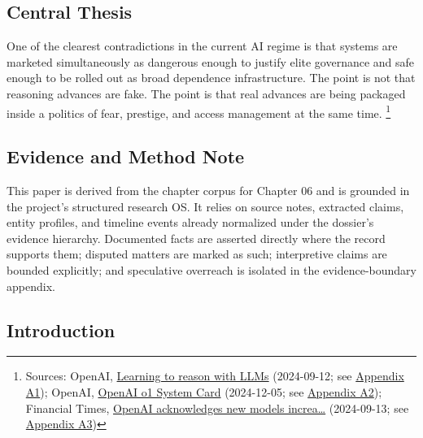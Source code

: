 \documentclass[
  american,
  11pt,
  letterpaper,
]{article}
\begin{document}
\subsection{Central Thesis}\label{central-thesis}

One of the clearest contradictions in the current AI regime is that
systems are marketed simultaneously as dangerous enough to justify elite
governance and safe enough to be rolled out as broad dependence
infrastructure. The point is not that reasoning advances are fake. The
point is that real advances are being packaged inside a politics of
fear, prestige, and access management at the same time. \footnote{Sources:
  OpenAI,
  \href{https://openai.com/index/learning-to-reason-with-llms/}{Learning
  to reason with LLMs} (2024-09-12; see
  \hyperref[appendix-a1-learning-to-reason-with-llms]{Appendix A1});
  OpenAI, \href{https://openai.com/index/openai-o1-system-card/}{OpenAI
  o1 System Card} (2024-12-05; see
  \hyperref[appendix-a2-openai-o1-system-card]{Appendix A2}); Financial
  Times,
  \href{https://www.ft.com/content/37ba7236-2a64-4807-b1e1-7e21ee7d0914}{OpenAI
  acknowledges new models increa\ldots{}} (2024-09-13; see
  \hyperref[appendix-a3-openai-acknowledges-new-models-increase-risk-of-misuse-to-create-bioweapons]{Appendix
  A3})}

\subsection{Evidence and Method Note}\label{evidence-and-method-note}

This paper is derived from the chapter corpus for Chapter 06 and is
grounded in the project's structured research OS. It relies on source
notes, extracted claims, entity profiles, and timeline events already
normalized under the dossier's evidence hierarchy. Documented facts are
asserted directly where the record supports them; disputed matters are
marked as such; interpretive claims are bounded explicitly; and
speculative overreach is isolated in the evidence-boundary appendix.

\subsection{Introduction}\label{introduction}
\end{document}
